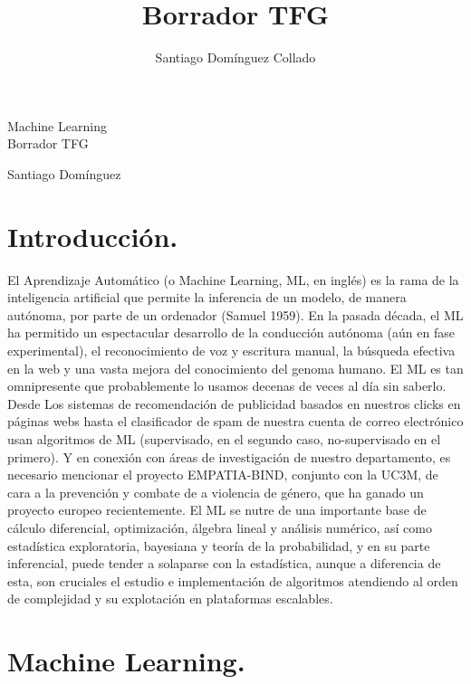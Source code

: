 \documentclass[a4paper,10pt]{article}
\author{Santiago Domínguez Collado}
\title{Borrador TFG}
\begin{document}
\begin{center}
\begin{LARGE}
Machine Learning \\
\vspace*{0.15in}
\UseRawInputEncoding
Borrador TFG
\end{LARGE}
\end{center}
\begin{center}
\begin{large}
Santiago Domínguez
\end{large}
\end{center}


\tableofcontents
\newpage



\section{Introducción.}
El Aprendizaje Automático (o Machine Learning, ML, en inglés) es la rama de la inteligencia artificial que permite la inferencia de un modelo, de manera autónoma, por parte de un ordenador (Samuel 1959). En la pasada década, el ML ha permitido un espectacular desarrollo de la conducción autónoma (aún en fase experimental), el reconocimiento de voz y escritura manual, la búsqueda efectiva en la web y una vasta mejora del conocimiento del genoma humano. El ML es tan omnipresente que probablemente lo usamos decenas de veces al día sin saberlo. Desde Los sistemas de recomendación de publicidad basados en nuestros clicks en páginas webs hasta el clasificador de spam de nuestra cuenta de correo electrónico usan algoritmos de ML (supervisado, en el segundo caso, no-supervisado en el primero). Y en conexión con áreas de investigación de nuestro departamento, es necesario mencionar el proyecto EMPATIA-BIND, conjunto con la UC3M, de cara a la prevención y combate de a violencia de género, que ha ganado un proyecto europeo recientemente.
El ML se nutre de una importante base de cálculo diferencial, optimización, álgebra lineal y análisis numérico, así como estadística exploratoria, bayesiana y teoría de la probabilidad, y en su parte inferencial, puede tender a solaparse con la estadística, aunque a diferencia de esta, son cruciales el estudio e implementación de algoritmos atendiendo al orden de complejidad y su explotación en plataformas escalables.

\section{Machine Learning.}
\end{document}
